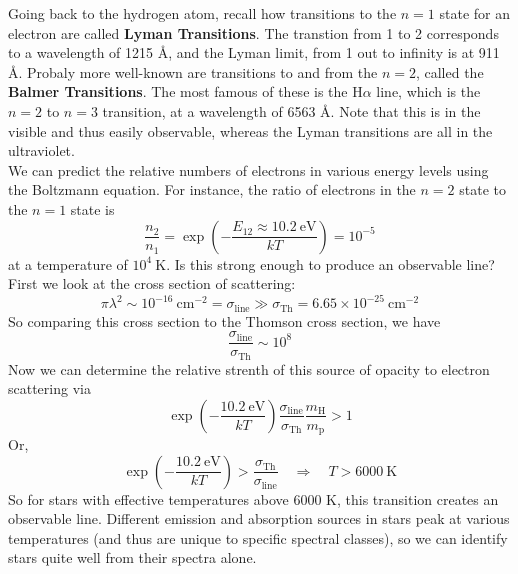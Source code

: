 \documentclass[10pt]{article}
\numberwithin{equation}{section}
\newcommand{\n}{\noindent}
\begin{document}
    \n Going back to the hydrogen atom, recall how transitions to the
    $n=1$ state for an electron are called \textbf{Lyman
      Transitions}. The transtion from 1 to 2 corresponds to a
    wavelength of 1215 \AA, and the Lyman limit, from 1 out to infinity
    is at 911 \AA. Probaly more well-known are transitions to and from the
    $n=2$, called the \textbf{Balmer Transitions}. The most famous of
    these is the H$\alpha$ line, which is the $n=2$ to $n=3$
    transition, at a wavelength of 6563 \AA. Note that this is in the
    visible and thus easily observable, whereas the Lyman transitions
    are all in the ultraviolet.\\

    \n We can predict the relative numbers of electrons in various
    energy levels using the Boltzmann equation. For instance, the
    ratio of electrons in the $n=2$ state to the $n=1$ state is 
    \begin{equation}
      \label{eq:217}
      \frac{n_2}{n_1}=\exp\left(-\frac{E_{12}\approx 10.2\ \mathrm{eV}}{kT}
\right)=10^{-5}
    \end{equation}
    at a temperature of $10^4\ \mathrm{K}$. Is this strong enough to
    produce an observable line? First we look at the cross section of
    scattering:
    \begin{equation}
      \label{eq:218}
      \pi\lambda^2\sim 10^{-16}\ \mathrm{cm^{-2}}=\sigma_{\mathrm{line}}\gg 
\sigma_{\mathrm{Th}}=6.65\times
      10^{-25}\ \mathrm{cm^{-2}}
    \end{equation}
    So comparing this cross section to the Thomson cross section, we
    have
    \begin{equation}
      \label{eq:219}
      \frac{\sigma_{\mathrm{line}}}{\sigma_{\mathrm{Th}}}\sim 10^8
    \end{equation}
    Now we can determine the relative strenth of this source of
    opacity to electron scattering via
    \begin{equation}
      \label{eq:220}
      \exp\left(-\frac{10.2\
          \mathrm{eV}}{kT}\right)\frac{\sigma_{\mathrm{line}}}{\sigma_
{\mathrm{Th}}}\frac{m_\mathrm{H}}{m_{\mathrm{p}}}>1
    \end{equation}
    Or,
    \begin{equation}
      \label{eq:221}
      \exp\left(-\frac{10.2\
          \mathrm{eV}}{kT}\right)>\frac{\sigma_{\mathrm{Th}}}{\sigma_
{\mathrm{line}}}\quad\Rightarrow\quad
      T>6000\ \mathrm{K}
    \end{equation}
    So for stars with effective temperatures above 6000 K, this
    transition creates an observable line. Different emission and
    absorption sources in stars peak at various temperatures (and thus
    are unique to specific spectral classes), so we can identify stars
    quite well from their spectra alone.
\end{document}
